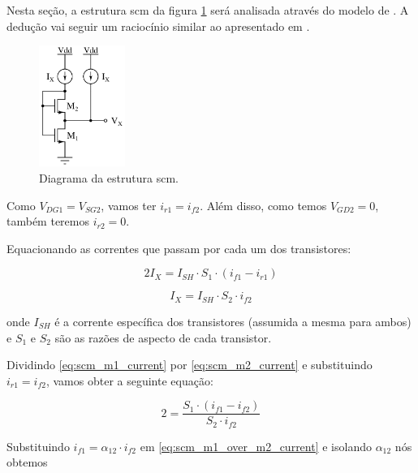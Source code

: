 \documentclass[10pt,a4paper]{extreport}
\newcommand{\?}{\stackrel{?}{=}}
\begin{document}
Nesta seção, a estrutura \acrshort{scm} da figura \ref{fig:scm_circuit} será analisada através do modelo de \cite{acm:book}. A dedução vai seguir um raciocínio similar ao apresentado em \cite{sbcs}.

\begin{figure}
    \centering
    \vspace{-0.4cm}
    \includegraphics[width=0.25\textwidth]{Imagens/scm_circuit.jpg}
    \caption{Diagrama da estrutura \acrshort{scm}.}
    \label{fig:scm_circuit}
\end{figure}

Como $V_{DG1}=V_{SG2}$, vamos ter $i_{r1}=i_{f2}$. Além disso, como temos $V_{GD2}=0$, também teremos $i_{r2}=0$.

Equacionando as correntes que passam por cada um dos transistores:

\begin{equation}
    \label{eq:scm_m1_current}
    2I_X=I_{SH}\cdot S_1\cdot\left(i_{f1}-i_{r1}\right)
\end{equation}

\begin{equation}
    \label{eq:scm_m2_current}
    I_X=I_{SH}\cdot S_2\cdot i_{f2}
\end{equation}

\noindent onde $I_{SH}$ é a corrente específica dos transistores (assumida a mesma para ambos) e $S_1$ e $S_2$ são as razões de aspecto de cada transistor.

Dividindo \eqref{eq:scm_m1_current} por \eqref{eq:scm_m2_current} e substituindo $i_{r1}=i_{f2}$, vamos obter a seguinte equação:

\begin{equation}
    \label{eq:scm_m1_over_m2_current}
    2=\frac{S_1\cdot\left(i_{f1}-i_{f2}\right)}{S_2\cdot i_{f2}}
\end{equation}

Substituindo $i_{f1}=\alpha_{12}\cdot i_{f2}$ em \eqref{eq:scm_m1_over_m2_current} e isolando $\alpha_{12}$ nós obtemos
\end{document}
